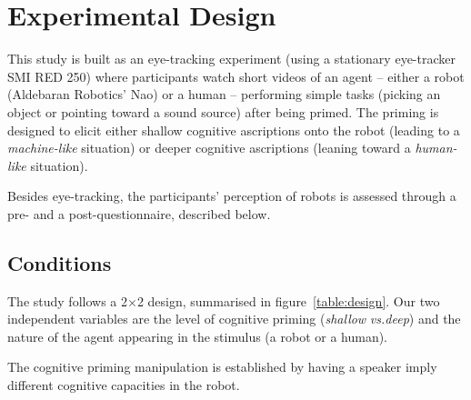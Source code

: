 \documentclass[lettersize, noapacite, twoside, HRI]{apa_HRI}
\newcommand{\vs}{\textit{vs.}\xspace}
\begin{document}
\section{Experimental Design}


This study is built as an eye-tracking experiment (using a stationary
eye-tracker SMI RED 250) where participants watch short videos of an agent --
either a robot (Aldebaran Robotics' Nao) or a human -- performing simple
tasks (picking an object or pointing toward a sound source) after being primed.
The priming is designed to elicit either shallow cognitive ascriptions onto the
robot (leading to a \emph{machine-like} situation) or deeper cognitive
ascriptions (leaning toward a \emph{human-like} situation).

Besides eye-tracking, the participants' perception of robots is assessed through a
pre- and a post-questionnaire, described below.

\subsection{Conditions}

The study follows a 2$\times$2 design, summarised in figure~\ref{table:design}.
Our two independent variables are the level of cognitive priming (\emph{shallow}
\vs \emph{deep}) and the nature of the agent appearing in the stimulus (a robot
or a human).

The cognitive priming manipulation is established by having a speaker imply
different cognitive capacities in the robot.
\end{document}

